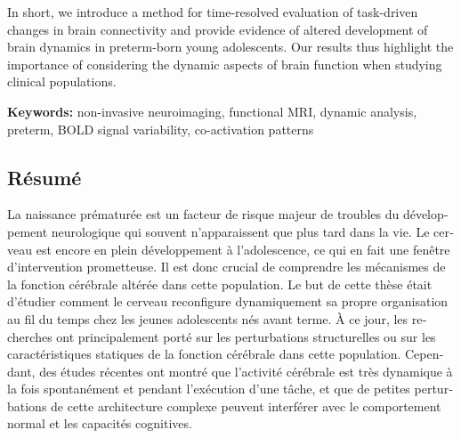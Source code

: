 \hspace{1cm} In short, we introduce a method for time-resolved evaluation of task-driven changes in brain connectivity and provide evidence of altered development of brain dynamics in preterm-born young adolescents. Our results thus highlight the importance of considering the dynamic aspects of brain function when studying clinical populations.

\vspace{0.5cm}

\textbf{Keywords:} non-invasive neuroimaging, functional MRI, dynamic analysis, preterm, BOLD signal variability, co-activation patterns



\begin{otherlanguage}{french}
\cleardoublepage
\chapter*{Résumé}

La naissance prématurée est un facteur de risque majeur de troubles du développement neurologique qui souvent n'apparaissent que plus tard dans la vie. Le cerveau est encore en plein développement à l'adolescence, ce qui en fait une fenêtre d'intervention prometteuse. Il est donc crucial de comprendre les mécanismes de la fonction cérébrale altérée dans cette population. Le but de cette thèse était d'étudier comment le cerveau reconfigure dynamiquement sa propre organisation au fil du temps chez les jeunes adolescents nés avant terme. À ce jour, les recherches ont principalement porté sur les perturbations structurelles ou sur les caractéristiques statiques de la fonction cérébrale dans cette population. Cependant, des études récentes ont montré que l'activité cérébrale est très dynamique à la fois spontanément et pendant l'exécution d'une tâche, et que de petites perturbations de cette architecture complexe peuvent interférer avec le comportement normal et les capacités cognitives.



\end{otherlanguage}
